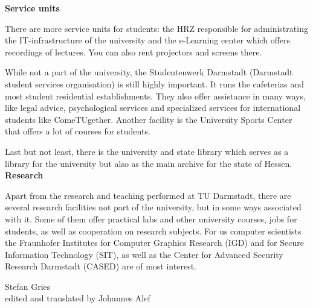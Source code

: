 {    \textbf{Service units}

    There are more service units for students: the HRZ responsible for administrating the IT-infrastructure of the university and the e-Learning center which offers recordings of lectures. You can also rent projectors and screens there.

    While not a part of the university, the Studentenwerk Darmstadt (Darmstadt student services organisation) is still highly important. It runs the cafeterias and most student residential establishments. They also offer assistance in many ways, like legal advice, psychological services and specialized services for international students like ComeTUgether. Another facility is the University Sports Center that offers a lot of courses for students.

    Last but not least, there is the university and state library which serves as a library for the university but also as the main archive for the state of Hessen.\\

    \textbf{Research}

    Apart from the research and teaching performed at TU Darmstadt, there are several research facilities not part of the university, but in some ways associated with it.
    Some of them offer practical labs and other university courses, jobs for students, as well as cooperation on research subjects. For us computer scientists the Fraunhofer Institutes for Computer Graphics Research (IGD) and for Secure Information Technology (SIT), as well as the Center for Advanced Security Research Darmstadt (CASED) are of most interest.
}
{Stefan Gries\\ edited and translated by Johannes Alef}
